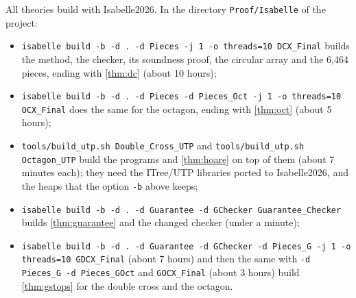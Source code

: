 \documentclass[11pt]{amsart}
\theoremstyle{plain}
\theoremstyle{definition}
\begin{document}
All theories build with Isabelle2026.  In the directory \texttt{Proof/Isabelle} of the project:
\begin{itemize}
\item \texttt{isabelle build -b -d . -d Pieces -j 1 -o threads=10 DCX\_Final} builds the method, the
checker, its soundness proof, the circular array and the 6{,}464 pieces, ending with \cref{thm:dc}
(about 10 hours);
\item \texttt{isabelle build -b -d . -d Pieces -d Pieces\_Oct -j 1 -o threads=10 OCX\_Final} does the
same for the octagon, ending with \cref{thm:oct} (about 5 hours);
\item \texttt{tools/build\_utp.sh Double\_Cross\_UTP} and \texttt{tools/build\_utp.sh Octagon\_UTP} build
the programs and \cref{thm:hoare} on top of them (about 7 minutes each); they need the ITree/UTP
libraries ported to Isabelle2026, and the heaps that the option \texttt{-b} above keeps;
\item \texttt{isabelle build -b -d . -d Guarantee -d GChecker Guarantee\_Checker} builds
\cref{thm:guarantee} and the changed checker (under a minute);
\item \texttt{isabelle build -b -d . -d Guarantee -d GChecker -d Pieces\_G -j 1 -o threads=10
GDCX\_Final} (about 7 hours) and then the same with \texttt{-d Pieces\_G -d Pieces\_GOct} and
\texttt{GOCX\_Final} (about 3 hours) build \cref{thm:gstops} for the double cross and the octagon.
\end{itemize}



\end{document}

